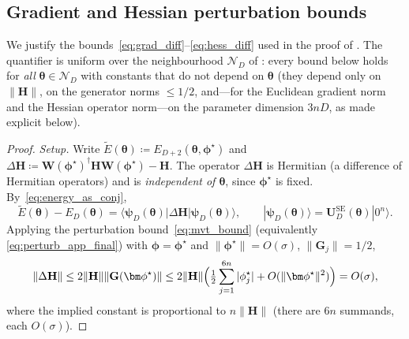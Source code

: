 \documentclass[11pt]{article}
\newcommand{\cN}{\mathcal{N}}
\theoremstyle{plain}
\theoremstyle{plain}
\begin{document}
\subsection{Gradient and Hessian perturbation bounds}\label{app:grad_hess}
We justify the bounds~\eqref{eq:grad_diff}--\eqref{eq:hess_diff}
used in the proof of .  The quantifier is uniform over
the neighbourhood $\cN_D$ of : every bound below
holds for \emph{all} $\bm\theta\in\cN_D$ with constants that do not
depend on $\bm\theta$ (they depend only on $\|\mathbf{H}\|$, on the
generator norms $\le 1/2$, and---for the Euclidean gradient norm and
the Hessian operator norm---on the parameter dimension $3nD$, as made
explicit below).
\begin{proof}
\emph{Setup.}
Write $\widetilde{E}(\bm\theta)\coloneqq E_{D+2}(\bm\theta,\bm\phi^\star)$
and
$\Delta\mathbf{H}\coloneqq\mathbf{W}(\bm\phi^\star)^\dagger\mathbf{H} \mathbf{W}(\bm\phi^\star)-\mathbf{H}$.
The operator $\Delta\mathbf{H}$ is Hermitian (a difference of Hermitian
operators) and is \emph{independent of $\bm\theta$}, since
$\bm\phi^\star$ is fixed.  By~\eqref{eq:energy_as_conj},
\begin{equation}\label{eq:gh_diff_state}
  \widetilde{E}(\bm\theta)-E_D(\bm\theta)
  =\langle\boldsymbol{\psi}_D(\bm\theta)| \Delta\mathbf{H} |\boldsymbol{\psi}_D(\bm\theta)\rangle ,
  \qquad
  |\boldsymbol{\psi}_D(\bm\theta)\rangle=\mathbf{U}_D^{\mathrm{SE}}(\bm\theta)|0^n\rangle .
\end{equation}
Applying the perturbation bound~\eqref{eq:mvt_bound} (equivalently
\eqref{eq:perturb_app_final}) with $\bm\phi=\bm\phi^\star$ and
$\|\bm\phi^\star\|=O(\sigma)$, $\|\mathbf{G}_j\|=1/2$,
\begin{equation}\label{eq:dH_bound}
  \|\Delta\mathbf{H}\|
  \le 2 \|\mathbf{H}\| \|\mathbf{G}(\bm\phi^\star)\|
  \le 2 \|\mathbf{H}\|\Bigl(\tfrac12\sum_{j=1}^{6n}|\phi_j^\star|
     +O(\|\bm\phi^\star\|^2)\Bigr)
  =O(\sigma),
\end{equation}
where the implied constant is proportional to $n\|\mathbf{H}\|$ (there are
$6n$ summands, each $O(\sigma)$).


\end{proof}
\end{document}
